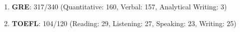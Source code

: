 


\begin{enumerate}[label={}]
    \vspace{0.4em}
    \item \textbf{GRE}: 317/340 (Quantitative: 160, Verbal: 157, Analytical Writing: 3)
    \item \textbf{TOEFL}: 104/120 (Reading: 29, Listening: 27, Speaking: 23, Writing: 25)
\end{enumerate}


